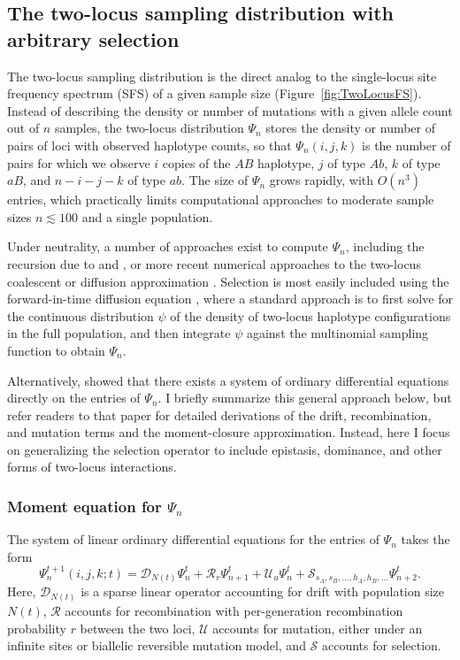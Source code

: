 \documentclass[]{article}
\begin{document}
\subsection{The two-locus sampling distribution with arbitrary selection}

The two-locus sampling distribution is the direct analog to the single-locus
site frequency spectrum (SFS) of a given sample size
(Figure~\ref{fig:TwoLocusFS}). Instead of describing the density or number of
mutations with a given allele count out of \(n\) samples, the two-locus
distribution \(\Psi_n\) stores the density or number of pairs of loci with
observed haplotype counts, so that \(\Psi_n(i, j, k)\) is the number of pairs
for which we observe \(i\) copies of the \(AB\) haplotype, \(j\) of type
\(Ab\), \(k\) of type \(aB\), and \(n-i-j-k\) of type \(ab\). The size of
\(\Psi_n\) grows rapidly, with \(O(n^3)\) entries, which practically limits
computational approaches to moderate sample sizes \(n\lesssim 100\) and a
single population.

Under neutrality, a number of approaches exist to compute \(\Psi_n\), including
the recursion due to \citet{Golding1984-pu} and \citet{Ethier1990-tb}, or more
recent numerical approaches to the two-locus coalescent \citep{Kamm2016-ag} or
diffusion approximation \citep{Ragsdale2017-gg}. Selection is most easily
included using the forward-in-time diffusion equation
\citep{Kimura1955-qe,Hill1966-gv}, where a standard approach is to first solve
for the continuous distribution \(\psi\) of the density of two-locus haplotype
configurations in the full population, and then integrate \(\psi\) against the
multinomial sampling function to obtain \(\Psi_n\).

Alternatively, \citet{Ragsdale2019-nt} showed that there exists a system of
ordinary differential equations directly on the entries of \(\Psi_n\). I
briefly summarize this general approach below, but refer readers to that paper
for detailed derivations of the drift, recombination, and mutation terms and
the moment-closure approximation. Instead, here I focus on generalizing the
selection operator to include epistasis, dominance, and other forms of
two-locus interactions.

\subsubsection{Moment equation for \(\Psi_n\)}

The system of linear ordinary differential equations for the entries of
\(\Psi_n\) takes the form
\begin{equation}
\label{eq:system}
{\Psi}_n^{t+1}(i, j, k; t) =
\mathcal{D}_{N(t)}\Psi_n^t
+ \mathcal{R}_{r}\Psi_{n+1}^t
+ \mathcal{U}_{u}\Psi_n^t
+ \mathcal{S}_{s_A, s_B, \ldots, h_A, h_B, \ldots}\Psi_{n+2}^t.
\end{equation}
Here, \(\mathcal{D}_{N(t)}\) is a sparse linear operator accounting for drift
with population size \(N(t)\), \(\mathcal{R}\) accounts for recombination
with per-generation recombination probability \(r\) between the two loci,
\(\mathcal{U}\) accounts for mutation, either under an infinite sites or
biallelic reversible mutation model, and \(\mathcal{S}\) accounts for
selection.
\end{document}
